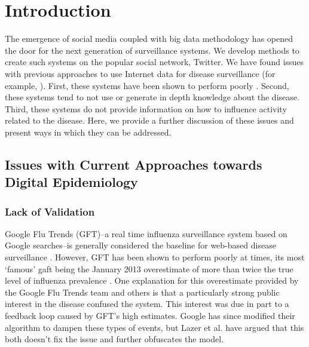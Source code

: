 
\chapter{Introduction} \label{intro}


The emergence of social media coupled with big data methodology has opened the door for the next generation of surveillance systems. We develop methods to create such systems on the popular social network, Twitter. We have found \cite{www2013} issues with previous approaches to use Internet data for disease surveillance (for example, \cite{gft,culotta2010towards,culotta2013lightweight,signorini2011use}). First, these systems have been shown to perform poorly \cite{www2013,butler2013google,copeland2013google,lazer2014twitter,lazer2014google}. Second, these systems tend to not use or generate in depth knowledge about the disease. Third, these systems do not provide information on how to influence activity related to the disease. Here, we provide a further discussion of these issues and present ways in which they can be addressed.

\section{Issues with Current Approaches towards Digital Epidemiology}
\subsection{Lack of Validation}
Google Flu Trends (GFT)--a real time influenza surveillance system based on Google searches--is generally considered the baseline for web-based disease surveillance \cite{gft}. However, GFT has been shown to perform poorly at times, its most `famous' gaft being the January 2013 overestimate of more than twice the true level of influenza prevalence \cite{butler2013google,copeland2013google,lazer2014google}. One explanation for this overestimate provided by the Google Flu Trends team \cite{copeland2013google} and others \cite{butler2013google,lazer2014google} is that a particularly strong public interest in the disease  confused the system. This interest was due in part to a feedback loop caused by GFT's high estimates. Google has since modified their algorithm to dampen these types of events\cite{copeland2013google}, but Lazer et al. \cite{lazer2014google} have argued that this both doesn't fix the issue and further obfuscates the model.

